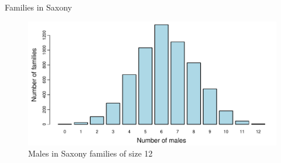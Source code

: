 \documentclass[11pt]{book}\usepackage[]{graphicx}\usepackage[]{color}
\newenvironment{knitrout}{}{} %
\renewenvironment{knitrout}{\small\renewcommand{\baselinestretch}{.85}}{} %
\begin{document}
\begin{Example}[saxony1]{Families in Saxony}
\begin{knitrout}
\begin{figure}[htbp]
\centerline{\includegraphics[width=.75\textwidth]{ch03/fig/saxony-barplot} }

\caption[Males in Saxony families of size 12]{Males in Saxony families of size 12\label{fig:saxony-barplot}}
\end{figure}


\end{knitrout}

\end{Example}
\end{document}
